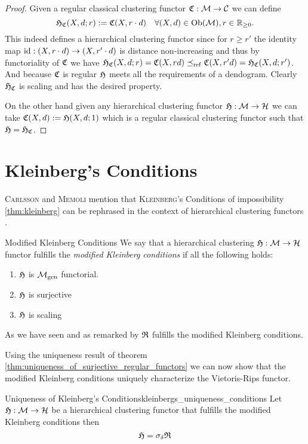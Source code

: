 \begin{proof}
Given a regular classical clustering functor $\mathfrak{C}: \mathcal{M} \to \mathcal{C}$ we can define
$$
\mathfrak{H}_{\mathfrak{C}}(X,d; r) := \mathfrak{C}(X, r \cdot d) \quad \forall (X,d) \in \mathrm {Ob}(\mathcal{M}), r \in \mathbb R_{\geq0}.
$$
This indeed defines a hierarchical clustering functor since for $r \geq r'$ the identity map $\mathrm{id}: (X, r \cdot d) \to (X, r' \cdot d)$ is distance non-increasing and thus by functoriality of $\mathfrak{C}$ we have $\mathfrak{H}_{\mathfrak{C}}(X,d;r) = \mathfrak{C}(X, r d) \preceq_\mathrm{ref} \mathfrak{C}(X, r' d) = \mathfrak{H}_{\mathfrak{C}}(X,d;r')$. And because $\mathfrak{C}$ is regular $\mathfrak{H}$ meets all the requirements of a dendogram.  Clearly $\mathfrak{H}_{\mathfrak{C}}$ is scaling and has the desired property.

On the other hand given any hierarchical clustering functor $\mathfrak{H}: \mathcal{M} \to \mathcal{H}$ we can take $\mathfrak{C}(X,d) := \mathfrak{H}(X,d; 1)$ which is a regular classical clustering functor such that $\mathfrak{H} = \mathfrak{H}_{\mathfrak{C}}$.
\end{proof}

\section{Kleinberg's Conditions}

\textsc{Carlsson} and \textsc{Memoli} mention that \textsc{Kleinberg}'s Conditions of impossibility \ref{thm:kleinberg} can be rephrased in the context of hierarchical clustering functors 
\cite[Comment~7.3.1]{Carlsson2010}.

\begin{definition}{Modified Kleinberg Conditions}{}
    We say that a hierarchical clustering $\mathfrak{H}: \mathcal{M} \to \mathcal{H}$ functor fulfills the \emph{modified Kleinberg conditions} if all the following holds:
    \begin{enumerate}
        \item $\mathfrak{H}$ is ${\mathcal{M}_\mathrm{gen}}$ functorial.
        \item $\mathfrak{H}$ is surjective
        \item $\mathfrak{H}$ is scaling
    \end{enumerate}
\end{definition}

As we have seen and as remarked by \cite{Carlsson2010} $\mathfrak{R}$ fulfills the modified Kleinberg conditions.

Using the uniqueness result of theorem \ref{thm:uniqueness_of_surjective_regular_functors} we can now show that the modified Kleinberg conditions uniquely characterize the Vietoris-Rips functor.

\begin{theorem}{Uniqueness of Kleinberg's Conditions}{kleinbergs_uniqueness_conditions}
    Let $\mathfrak{H}: \mathcal{M} \to \mathcal{H}$ be a hierarchical clustering functor that fulfills the modified Kleinberg conditions then
    $$
    \mathfrak{H} = \sigma_\delta \mathfrak{R}
    $$
\end{theorem}

